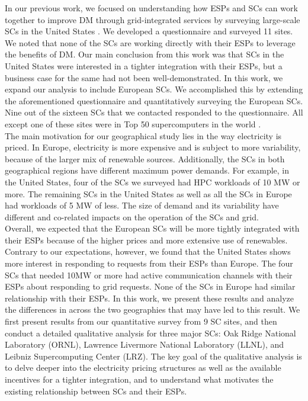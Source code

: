 In our previous work, we focused on understanding how ESPs and SCs can work together to improve DM through grid-integrated services by surveying large-scale SCs in the United States \cite{BatesESP}. We developed a questionnaire and surveyed 11 sites. We noted that none of the SCs are working directly with their ESPs to leverage the benefits of DM. Our main conclusion from this work was that SCs in the United States were interested in a tighter integration with their ESPs, but a business case for the same had not been well-demonstrated. In this work, we expand our analysis to include European SCs. We accomplished this by extending the aforementioned questionnaire and quantitatively surveying the European SCs. Nine out of the sixteen SCs that we contacted responded to the questionnaire. All except one of these sites were in Top 50 supercomputers in the world \cite{Top500}. \\

The main motivation for our geographical study lies in the way electricity is priced. In Europe, electricity is more expensive and is subject to more variability, because of the larger mix of renewable sources. Additionally, the SCs in both geographical regions have different maximum power demands. For example, in the United States, four of the SCs we surveyed had HPC workloads of 10 MW or more. The remaining SCs  in the United States as well as all the SCs in Europe had workloads of 5 MW of less. The size of demand and its variability have different and co-related impacts on the operation of the SCs and grid. \\

Overall, we expected that the European SCs will be more tightly integrated with their ESPs because of the higher prices and more extensive use of renewables.  Contrary to our expectations, however, we found that the United States shows more interest in responding to requests from their ESPs than Europe. The four SCs that needed 10MW or more had active communication channels with their ESPs about responding to grid requests.  None of the SCs in Europe had similar relationship with their ESPs. In this work, we present these results and analyze the differences in across the two geographies that may have led to this result. We first present results from our quantitative survey from 9 SC sites, and then conduct a detailed qualitative analysis for three major SCs: Oak Ridge National Laboratory (ORNL), Lawrence Livermore National Laboratory (LLNL), and Leibniz Supercomputing Center (LRZ). The key goal of the qualitative analysis is to delve deeper into the electricity pricing structures as well as the available incentives for a tighter integration, and to understand what motivates the existing relationship between SCs and their ESPs. \\

